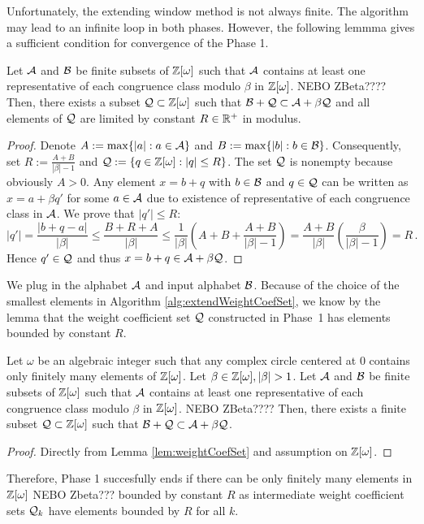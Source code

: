 Unfortunately, the extending window method is not always finite. The algorithm may lead to an infinite loop in both phases. 
However, the following lemmma gives a sufficient condition for convergence of the Phase 1. 
\begin{lem}
\label{lem:weightCoefSet}
    Let $\mathcal{A}$ and $\mathcal{B}$ be finite subsets of $\mathbb{Z}[\omega]$ such that $\mathcal{A}$ contains at least one representative of each congruence class modulo $\beta$ in $\mathbb{Z}[\omega]$. NEBO ZBeta???? Then, there exists a subset $\mathcal{Q}\subset\mathbb{Z}[\omega]$ such that $ \mathcal{B} + \mathcal{Q} \subset \mathcal{A} + \beta \mathcal{Q}$ and all elements of $\mathcal{Q}$ are limited by constant $R\in \mathbb{R}^+$ in modulus.
\end{lem}
\begin{proof}
 Denote $A:=\max\{|a|:a \in \mathcal{A}\}$ and $B:=\max\{|b|:b\in\mathcal{B}\}$. Consequently, set $R:=\frac{A+B}{|\beta|-1}$ and $\mathcal{Q}:=\{q\in\mathbb{Z}[\omega]:|q|\leq R\}$. The set $\mathcal{Q}$ is nonempty because obviously $A>0$. Any element $x=b+q$ with $b\in\mathcal{B}$ and $q\in\mathcal{Q}$ can be written as $x=a+\beta q'$ for some $a\in\mathcal{A}$ due to existence of representative of each congruence class in $\mathcal{A}$. We prove that $|q'|\leq R$:
 $$
    |q'|=\frac{|b+q-a|}{|\beta|}\leq \frac{B+R+A}{|\beta|} \leq \frac{1}{|\beta|}\left(A+B+\frac{A+B}{|\beta|-1}\right)  =\frac{A+B}{|\beta|}\left(\frac{\beta}{|\beta|-1}\right)=R\,.
 $$ 
 Hence $q'\in\mathcal{Q}$ and thus  $x=b+q \in \mathcal{A} + \beta \mathcal{Q}$.
\end{proof}
We plug in the alphabet $\mathcal{A}$ and input alphabet $\mathcal{B}$. Because of the choice of the smallest elements in Algorithm \ref{alg:extendWeightCoefSet}, we know by the lemma that the weight coefficient set $\mathcal{Q}$ constructed in Phase~1 has elements bounded by constant $R$. 
\begin{theo}
    Let $\omega$ be an algebraic integer such that any complex circle centered at 0 contains only finitely  many elements of $\mathbb{Z}[\omega]$. Let $\beta \in \Zomega, |\beta|>1$. Let $\mathcal{A}$ and $\mathcal{B}$ be finite subsets of $\mathbb{Z}[\omega]$ such that $\mathcal{A}$ contains at least one representative of each congruence class modulo $\beta$ in $\mathbb{Z}[\omega]$. NEBO ZBeta???? Then, there exists a finite subset $\mathcal{Q}\subset\mathbb{Z}[\omega]$ such that $ \mathcal{B} + \mathcal{Q} \subset \mathcal{A} + \beta \mathcal{Q}$.
\end{theo} 
\begin{proof}
    Directly from Lemma \ref{lem:weightCoefSet} and assumption on $\mathbb{Z}[\omega]$.
\end{proof}
Therefore, Phase 1 succesfully ends if there can be only finitely many elements in $\mathbb{Z}[\omega]$ NEBO Zbeta??? bounded by constant $R$ as intermediate weight coefficient sets $\mathcal{Q}_k$ have elements bounded by $R$ for all $k$. 
